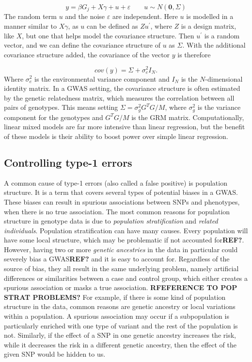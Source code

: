 \begin{equation}\label{eq:baseMixedModelGWAS}
y = \beta G_{j} +  X\gamma + u + \varepsilon \qquad u \sim N(\mathbf{0}, \Sigma)
\end{equation}
The random term $ u $ and the noise $ \varepsilon $ are independent. Here $ u $ is modelled in a manner similar to $ X\gamma $, as $ u $ can be defined as $ Zu^{'} $, where $ Z $ is a design matrix, like $ X $, but one that helps model the covariance structure. Then $ u^{'} $ is a random vector, and we can define the covariance structure of $ u $ as $ \Sigma $. With the additional covariance structure added, the covariance of the vector $ y $ is therefore

\begin{equation}
cov(y) = \Sigma + \sigma^2_e I_N.
\end{equation}
Where $ \sigma^2_e $ is the environmental variance component and $ I_N $ is the $ N $-dimensional identity matrix. In a GWAS setting, the covariance structure is often estimated by the genetic relatedness matrix, which measures the correlation between all pairs of genotypes. This means setting $ \Sigma = \sigma^2_g G^TG/M$, where $ \sigma_g^2 $ is the variance component for the genotypes and $ G^TG/M $ is the GRM matrix. Computationally, linear mixed models are far more intensive than linear regression, but the benefit of these models is their ability to boost power over simple linear regression.


\subsection{Controlling type-1 errors}
A common cause of type-1 errors (also called a false positive) is population structure. It is a term that covers several types of potential biases in a GWAS. These biases can result in spurious associations between SNPs and phenotypes, when there is no true association. The most common reasons for population structure in genotype data is due to \textit{population stratification} and \textit{related individuals}. Population stratification can have many causes. Every population will have some local structure, which may be problematic if not accounted for\textbf{REF?}. However, having two or more \textit{genetic ancestries} in the data in particular could severely bias a GWAS\textbf{REF?} and it is easy to account for. Regardless of the source of bias, they all result in the same underlying problem, namely artificial differences or similarities between a case and control group, which either creates a spurious association or masks a true association. \textbf{RFEFERENCE TO POP STRAT PROBLEMS?}
For example, if there is some kind of population structure in the data, common reasons are genetic ancestry or local variations within a population. A spurious association may occur if a subpopulation is particularly enriched with one type of variant and the rest of the population is not. Similarly, if the effect of a SNP in one genetic ancestry increases the risk, while it decreases the risk in a different genetic ancestry, then the effect of the given SNP would be hidden to us.

